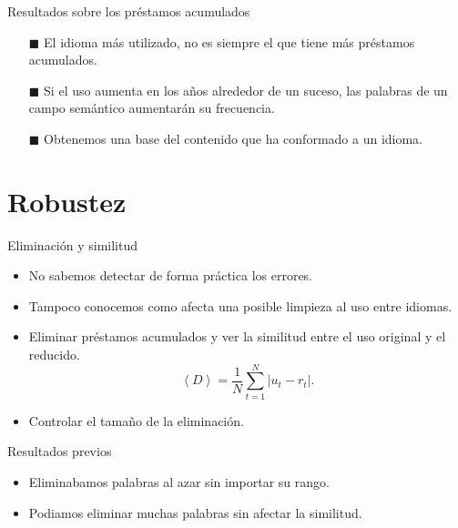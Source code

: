 \documentclass[10pt,xcolor={usenames,dvipsnames}]{beamer}
\begin{document}
\begin{frame}{Resultados sobre los préstamos acumulados}
	\begin{itemize}
		\item [$\blacksquare$]  El idioma más utilizado, no es siempre el que tiene más préstamos acumulados.
		\item [$\blacksquare$] Si el uso aumenta en los años alrededor de un suceso, las palabras de un campo semántico aumentarán su frecuencia.
		\item [$\blacksquare$] Obtenemos una base del contenido que ha conformado a un idioma.
	\end{itemize}
\end{frame}

\section{Robustez} 

\begin{frame}[fragile]{Eliminación y similitud}
	\only<1->{
	Problemas :}
	\begin{itemize}
		\item <2->No sabemos detectar de forma práctica los errores.
		\item <3->Tampoco conocemos como afecta una posible limpieza al uso entre idiomas.
	\end{itemize}
	
	\begin{itemize}
		\item <4->Eliminar préstamos acumulados y ver la similitud entre el uso original y el reducido.
		$$
		\left\langle D \right\rangle  = \frac{1}{N}\sum_{t=1}^{N} \left| u_{t} - r_{t} \right|.
		$$
		\item <5>Controlar el tamaño de la eliminación. 
	\end{itemize}
\end{frame}

\begin{frame}{Resultados previos}
	\begin{itemize}
	\item<1-> [$\blacksquare$]  Eliminabamos palabras al azar sin importar su rango.
	\end{itemize}
	\begin{itemize}
	\item<3-> [$\blacksquare$] Podiamos eliminar muchas palabras sin afectar la similitud.
	\end{itemize}
\end{frame}
\end{document}
